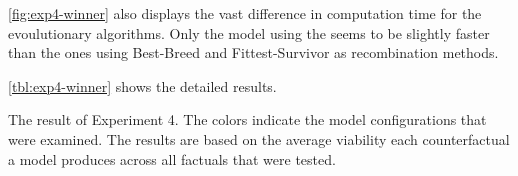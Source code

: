 \documentclass[./../../paper.tex]{subfiles}
\begin{document}
\autoref{fig:exp4-winner} also displays the vast difference in computation time for the evoulutionary algorithms. Only the model using the  seems to be slightly faster than the ones using Best-Breed and Fittest-Survivor as recombination methods.

\autoref{tbl:exp4-winner} shows the detailed results.

\begin{table}
    \caption{The result of Experiment 4. The colors indicate the model configurations that were examined. The results are based on the average viability each counterfactual a model produces across all factuals that were tested.}
    \label{tbl:exp4-winner}
\makebox[\linewidth]{


}
\end{table}
\end{document}
